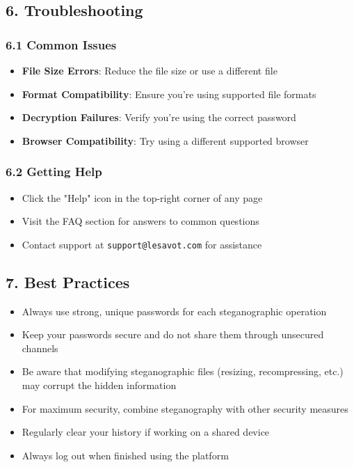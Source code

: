 \documentclass[12pt, a4paper, oneside]{book}
\begin{document}
\subsection*{6. Troubleshooting}

\subsubsection*{6.1 Common Issues}

\begin{itemize}
    \item \textbf{File Size Errors}: Reduce the file size or use a different file
    \item \textbf{Format Compatibility}: Ensure you're using supported file formats
    \item \textbf{Decryption Failures}: Verify you're using the correct password
    \item \textbf{Browser Compatibility}: Try using a different supported browser
\end{itemize}

\subsubsection*{6.2 Getting Help}

\begin{itemize}
    \item Click the "Help" icon in the top-right corner of any page
    \item Visit the FAQ section for answers to common questions
    \item Contact support at \texttt{support@lesavot.com} for assistance
\end{itemize}

\subsection*{7. Best Practices}

\begin{itemize}
    \item Always use strong, unique passwords for each steganographic operation
    \item Keep your passwords secure and do not share them through unsecured channels
    \item Be aware that modifying steganographic files (resizing, recompressing, etc.) may corrupt the hidden information
    \item For maximum security, combine steganography with other security measures
    \item Regularly clear your history if working on a shared device
    \item Always log out when finished using the platform
\end{itemize}
\end{document}
